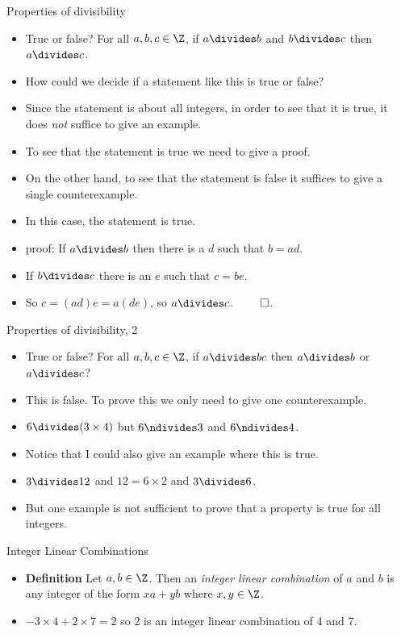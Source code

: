 \documentclass{beamer}
\begin{document}
\begin{frame}{Properties of divisibility}

\begin{itemize}
  \item True or false? For all $a,b,c\in\Z$, if
  $a\divides b$ and $b\divides c$ then $a\divides c$.
  \item How could we decide if a statement like this is true or false?
  \item Since the statement is about all integers, in order to see that it
  is true, it does \emph{not} suffice to give an example.
  \item To see that the statement is true we need to give a proof.
  \item On the other hand, to see that the statement is false it suffices
  to give a single counterexample.
  \item In this case, the statement is true.
  \item proof: If $a\divides b$ then there is a $d$ such that $b=ad$.
  \item If $b\divides c$ there is an $e$ such that $c = b e$.
  \item So $c = (a d) e = a (de)$, so $a\divides c$. $\qed$.
\end{itemize}

\end{frame}

\begin{frame}{Properties of divisibility, 2}

\begin{itemize}
  \item True or false? For all $a,b,c\in\Z$, if $a\divides bc$ then
  $a\divides b$ or $a\divides c$?
  \item This is false. To prove this we only need to give one counterexample.
  \item $6\divides (3\times 4)$ but $6\ndivides 3$ and $6\ndivides 4$.
  \item Notice that I could also give an example where this is true.
  \item $3 \divides 12$ and $12 = 6 \times 2$ and $3\divides 6$.
  \item But one example is not sufficient to prove that a property is true
  for all integers.
\end{itemize}

\end{frame}

\begin{frame}{Integer Linear Combinations}

\begin{itemize}
  \item \textbf{Definition} Let $a,b\in\Z$. Then an
  \emph{integer linear combination} of $a$ and $b$ is any integer of the
  form $xa + yb$ where $x,y\in\Z$.
  \item $-3\times 4 + 2\times 7 = 2$ so 2 is an integer linear combination
  of 4 and 7.
\end{itemize}

\end{frame}
\end{document}
